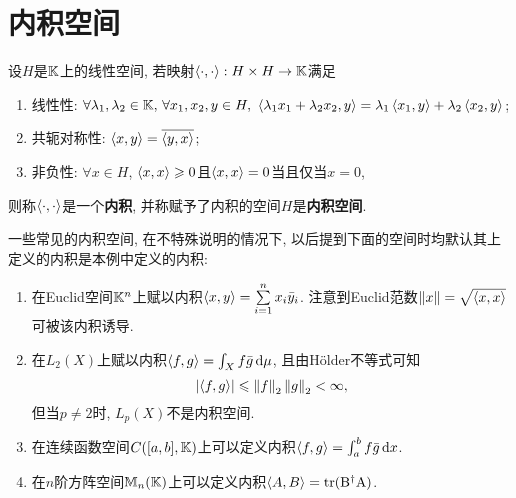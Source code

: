 \section{内积空间}
	
	\begin{Definition}[内积空间]
	设$ H $是$ \mathbb{K} $上的线性空间, 若映射$ \left\langle \cdot,\cdot \right\rangle : H\times H\to\mathbb{K} $满足
	\begin{enumerate}[(1)]
	\item 线性性: $ \forall \lambda_1,\lambda_2\in\K,\,\forall x_1,x_2,y\in H,\ \lrangle{\lambda_1x_1+\lambda_2x_2,y}=\lambda_1\lrangle{x_1,y}+\lambda_2\lrangle{x_2,y} $;
	\item 共轭对称性: $ \left\langle x,y \right\rangle=\overline{\left\langle y,x \right\rangle} $;
	\item 非负性: $ \forall x\in H $, $ \left\langle x,x \right\rangle\geqslant 0 $且$ \left\langle x,x \right\rangle=0 $当且仅当$ x=0 $,
	\end{enumerate}
	则称$ \left\langle \cdot,\cdot \right\rangle $是一个\textbf{内积}, 并称赋予了内积的空间$ H $是\textbf{内积空间}.
	\end{Definition}
	
	\begin{Example}
	一些常见的内积空间, 在不特殊说明的情况下, 以后提到下面的空间时均默认其上定义的内积是本例中定义的内积:
	\begin{enumerate}[(1)]
	\item 在Euclid空间$ \mathbb{K}^n $上赋以内积$ \left\langle x,y \right\rangle=\sum\limits_{i=1}^nx_i\bar{y}_i $. 注意到Euclid范数$ \left\| x \right\|=\sqrt{\left\langle x,x \right\rangle} $可被该内积诱导.
	\item 在$ L_2(X) $上赋以内积$ \left\langle f,g \right\rangle=\int_Xf\bar{g}\,\mathrm{d}\mu $, 且由H\"older不等式可知
	\[
	\left| \left\langle f,g \right\rangle \right| \leqslant\left\| f \right\|_2\left\| g \right\|_2<\infty,
	\]
	但当$ p\ne 2 $时, $ L_p(X) $不是内积空间.
	\item 在连续函数空间$ C([a,b],\mathbb{K}) $上可以定义内积$ \left\langle f,g \right\rangle=\int_a^bf\bar{g}\,\mathrm{d} x $.
	\item 在$ n $阶方阵空间$ \mathbb{M}_n(\mathbb{K}) $上可以定义内积$ \left\langle A,B \right\rangle=\mathrm{tr(B^\dagger A)} $.
	\end{enumerate}
	\end{Example}
	

